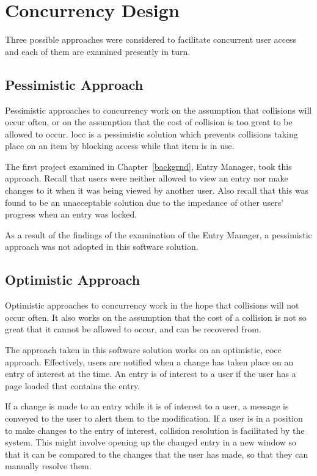 \section{Concurrency Design}
\label{concurrency}
Three possible approaches were considered to facilitate concurrent user access and each of them are examined presently in turn.

\subsection{Pessimistic Approach}
Pessimistic approaches to concurrency work on the assumption that collisions will occur often, or on the assumption that the cost of collision is too great to be allowed to occur.  \gls{locc} is a pessimistic solution \cite{loccCocc} which prevents collisions taking place on an item by blocking access while that item is in use.

The first project examined in Chapter~\ref{backgrnd}, \bibtex{} Entry Manager, took this approach.  Recall that users were neither allowed to view an entry nor make changes to it when it was being viewed by another user.  Also recall that this was found to be an unacceptable solution due to the impedance of other users' progress when an entry was locked.

As a result of the findings of the examination of the \bibtex{} Entry Manager, a pessimistic approach was not adopted in this software solution.

\subsection{Optimistic Approach}
Optimistic approaches to concurrency work in the hope that collisions will not occur often.  It also works on the assumption that the cost of a collision is not so great that it cannot be allowed to occur, and can be recovered from.

The approach taken in this software solution works on an optimistic, \gls{cocc} approach.  Effectively, users are notified when a change has taken place on an entry of interest at the time.  An entry is of interest to a user if the user has a page loaded that contains the entry.

If a change is made to an entry while it is of interest to a user, a message is conveyed to the user to alert them to the modification.  If a user is in a position to make changes to the entry of interest, collision resolution is facilitated by the system.  This might involve opening up the changed entry in a new window so that it can be compared to the changes that the user has made, so that they can manually resolve them.

